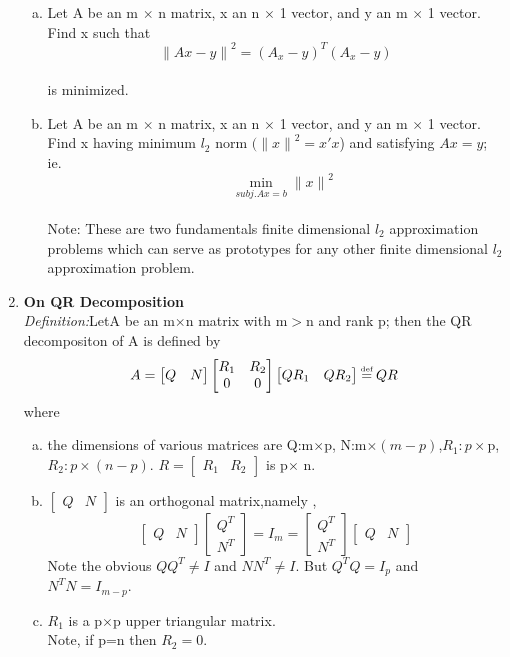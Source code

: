 \documentclass[journal,12pt,twocolumn]{IEEEtran}
\begin{document}
\begin{enumerate}
\begin{enumerate}[(a)]
\item Let A be an m $\times$ n matrix, x an n $\times$ 1 vector, and y an m $\times$ 1 vector. Find x such that\\
$${\|A{x}-y\|}^2 =(A_{x}-y)^T(A_{x}-y)$$\\
is minimized.\\
\item Let A be an m $\times$ n matrix, x an n $\times$ 1 vector, and y an m $\times$ 1 vector. Find x having minimum $l_2$ norm $({\|{x}\|}^2=x'x$) and satisfying $Ax=y$; ie.
$$ \quad\min_{subj.Ax=b}{\|{x}\|}^2$$\\
Note: These are two fundamentals finite dimensional $l_2$ approximation problems which can serve as prototypes for any other finite dimensional $l_2$ approximation problem.
\end{enumerate}
\item \textbf{On QR Decomposition}\\
\textit{Definition:}LetA be an m$\times$n matrix with m$>$n and rank p; then the QR decompositon of A is defined by\\
\begin{align*}
A=\begin{bmatrix}Q & N\end{bmatrix}
\begin{bmatrix}R_1&R_2\\0&0\end{bmatrix}\begin{bmatrix}QR_1&QR_2\end{bmatrix}&\myeq QR\\
\end{align*}
where
\begin{enumerate}[(a)]
\item the dimensions of various matrices are Q:m$\times$p, N:m$\times(m-p)$,$R_1:p\times$p,$R_2:p\times(n-p).$
$R=\begin{bmatrix} R_1&R_2\end{bmatrix}$ is p$\times$ n.
\item $\begin{bmatrix}Q&N\end{bmatrix}$ is an orthogonal matrix,namely ,
$$\begin{bmatrix}Q&N\end{bmatrix}
\begin{bmatrix}Q^T\\N^T\end{bmatrix}=I_m=\begin{bmatrix}Q^T\\N^T\end{bmatrix}
\begin{bmatrix}Q&N\end{bmatrix}$$
Note the obvious $QQ^T\neq I$ and $NN^T\neq I$. But $Q^TQ=I_{p}$ and $N^TN=I_{m-p}.$
\item $R_1$ is a p$\times$p upper triangular matrix.\\
Note, if p=n then $R_2=0.$
\end{enumerate}
\begin{enumerate}[(a)]


\end{enumerate}
\end{enumerate}
\end{document}
